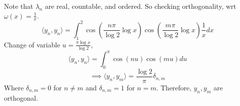  Note that $\lambda_n$ are real, countable, and ordered. So checking orthogonality, wrt
 $\omega(x)=\frac{1}{x}$.
 \[\langle y_n,y_n \rangle =\int_1^2 \cos(\frac{n\pi}{\log 2}\log x)\cos(\frac{m\pi}{\log
 2}\log x)\frac{1}{x} dx\]
 Change of  variable $u=\frac{\pi \log x}{\log 2}$,
 \[\langle y_n,y_n \rangle =\int_0^{\pi} \cos(nu)\cos(mu)du\]
 \[\implies \langle y_n, y_m \rangle =\frac{\log 2}{\pi}\delta_{n,m}\]
 Where $\delta_{n,m}=0$ for $n\neq m$ and $\delta_{n,m}=1$ for $n=m$. Therefore, $y_n,
 y_m$ are orthogonal.

